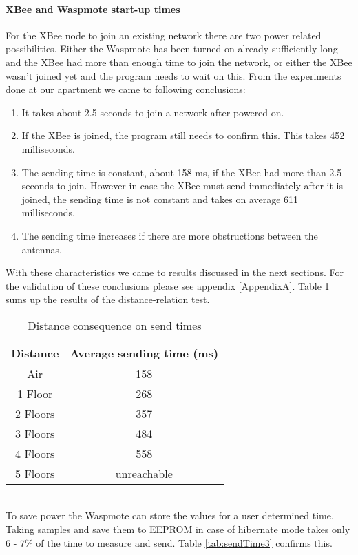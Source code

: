 \paragraph{XBee and Waspmote start-up times}
For the XBee node to join an existing network there are two power related possibilities. Either the Waspmote has been turned on already sufficiently long and the XBee had more than enough time to join the network, or either the XBee wasn't joined yet and the program needs to wait on this. From the experiments done at our apartment we came to following conclusions:
\begin{enumerate}
\item It takes about 2.5 seconds to join a network after powered on.
\item If the XBee is joined, the program still needs to confirm this. This takes 452 milliseconds.
\item The sending time is constant, about 158 ms, if the XBee had more than 2.5 seconds to join. However in case the XBee must send immediately after it is joined, the sending time is not constant and takes on average 611 milliseconds.
\item The sending time increases if there are more obstructions between the antennas. 
\end{enumerate}
With these characteristics we came to results discussed in the next sections. For the validation of these conclusions please see appendix \ref{AppendixA}. Table \ref{tab:sendTime} sums up the results of the distance-relation test.
\begin{table}[!ht]
\begin{center}
\begin{tabular}[!ht]{|c|c|}
\hline
\textbf{Distance} & \textbf{Average sending time (ms)}\\
\hline
Air & 158\\
\hline
1 Floor & 268\\
\hline
2 Floors & 357\\
\hline
3 Floors & 484\\
\hline
4 Floors & 558\\
\hline
5 Floors & unreachable\\
\hline
\end{tabular}
\caption{Distance consequence on send times}
\label{tab:sendTime}
\end{center}
\end{table}\\
To save power the Waspmote can store the values for a user determined time. Taking samples and save them to EEPROM in case of hibernate mode takes only 6 - 7\% of the time to measure and send. Table \ref{tab:sendTime3} confirms this.
